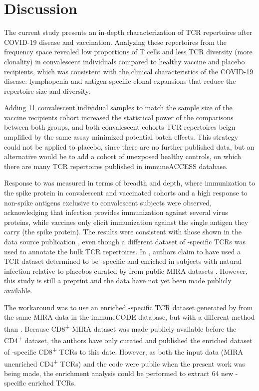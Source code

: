 \chapter*{Discussion}
\label{cap:dis}


The current study presents an in-depth characterization of TCR repertoires after COVID-19 disease and vaccination. Analyzing these repertoires from the frequency space revealed low proportions of T cells and less TCR diversity (more clonality) in convalescent individuals compared to healthy vaccine and placebo recipients, which was consistent with the clinical characteristics of the COVID-19 disease: lymphopenia and antigen-specific clonal expansions that reduce the repertoire size and diversity.

Adding 11 convalescent individual samples to match the sample size of the vaccine recipients cohort increased the statistical power of the comparisons between both groups, and both convalescent cohorts TCR repertoires beign amplified by the same assay minimized potential batch effects. This strategy could not be applied to placebo, since there are no further published data, but an alternative would be to add a cohort of unexposed healthy controls, on which there are many TCR repertoires published in immuneACCESS database.

Response to \covid{} was measured in terms of breadth and depth, where immunization to the spike protein in convalescent and vaccinated cohorts and a high response to non-spike antigens exclusive to convalescent subjects were observed, acknowledging that infection provides immunization against several virus proteins, while vaccines only elicit immunization against the single antigen they carry (the spike protein). The results were consistent with those shown in the data source publication \citep{janssen}, even though a different dataset of \covid-specific TCRs was used to annotate the bulk TCR repertoires. In \cite{janssen}, authors claim to have used a TCR dataset determined to be \covid-specific and enriched in subjects with natural infection relative to placebos curated by \cite{snyder} from public MIRA datasets \citep{immunecode}. However, this study is still a preprint and the data have not yet been made publicly available.

The workaround was to use an enriched \covid-specific TCR dataset generated by \cite{metaclonotypes} from the same MIRA data in the immuneCODE database, but with a different method than \cite{snyder}. Because CD8\textsuperscript{+} MIRA dataset was made publicly available before the CD4\textsuperscript{+} dataset, the authors have only curated and published the enriched dataset of \covid-specific CD8\textsuperscript{+} TCRs to this date. However, as both the input data (MIRA unenriched CD4\textsuperscript{+} TCRs) and the code were public when the present work was being made, the enrichment analysis could be performed to extract 64 new \covid-specific enriched TCRs.

